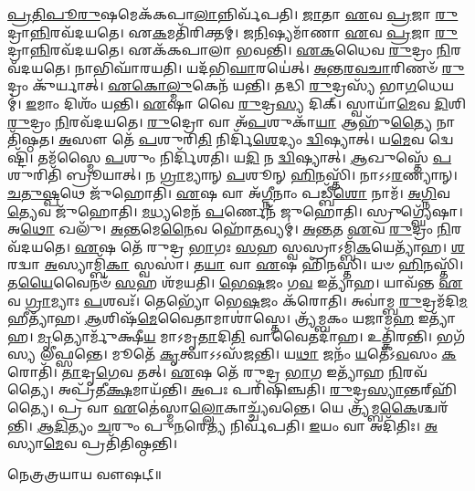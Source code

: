 \-\ul{𑌪𑍍𑌰}\-\-\ul{𑌤𑌿}\-\-\ul{𑌪𑍂}\-\-\ul{𑌰𑍁}\-𑌷𑌮𑍇𑌕᳴𑌕𑌪𑌾\-\ul{𑌲𑌾}\-𑌨𑍍𑌨𑌿𑌰𑍍𑌵᳴𑌪𑌤𑌿। \ul{𑌜𑌾}\-𑌤𑌾 \ul{𑌏}\-𑌵 \ul{𑌪𑍍𑌰}\-𑌜𑌾 \ul{𑌰𑍁}\-𑌦𑍍𑌰𑌾\-\ul{𑌨𑍍𑌨𑌿}\-𑌰𑌵᳴𑌦𑌯𑌤𑍇। 𑌏\-\ul{𑌕}\-𑌮𑌤𑌿᳴𑌰𑌿𑌕𑍍𑌤𑌮𑍍। \ul{𑌜}\-\-\ul{𑌨𑌿}\-𑌷𑍍𑌯𑌮𑌾᳴𑌣𑌾 \ul{𑌏}\-𑌵 \ul{𑌪𑍍𑌰}\-𑌜𑌾 \ul{𑌰𑍁}\-𑌦𑍍𑌰𑌾\-\ul{𑌨𑍍𑌨𑌿}\-𑌰𑌵᳴𑌦𑌯𑌤𑍇। 𑌏𑌕᳴𑌕𑌪𑌾𑌲𑌾 𑌭𑌵𑌨𑍍𑌤𑌿। \ul{𑌏}\-\-\ul{𑌕}\-𑌧𑍈𑌵 \ul{𑌰𑍁}\-𑌦𑍍𑌰𑌂 \ul{𑌨𑌿}\-𑌰𑌵᳴𑌦𑌯𑌤𑍇। 𑌨𑌾𑌭𑌿𑌘𑌾᳴𑌰𑌯𑌤𑌿। 𑌯𑌦᳴𑌭𑌿\-\ul{𑌘𑌾}\-𑌰𑌯𑍇॑𑌤𑍍। \ul{𑌅}\-\-\ul{𑌨𑍍𑌤}\-\-\ul{𑌰}\-\-\ul{𑌵}\-\-\ul{𑌚𑌾}\-𑌰𑌿𑌣𑍞᳴ \ul{𑌰𑍁}\-𑌦𑍍𑌰𑌂 𑌕𑍁᳴𑌰𑍍𑌯𑌾𑌤𑍍। \ul{𑌏}\-\-\ul{𑌕𑍋}\-\-\ul{𑌲𑍍𑌮𑍁}\-𑌕𑍇𑌨᳴ 𑌯𑌨𑍍𑌤𑌿। 
𑌤𑌦𑍍𑌧𑌿 \ul{𑌰𑍁}\-𑌦𑍍𑌰𑌸𑍍𑌯᳴ 𑌭𑌾\-\ul{𑌗}\-𑌧𑍇𑌯𑌮𑍍॑। \ul{𑌇}\-𑌮𑌾𑌂 𑌦𑌿𑌶𑌂᳴ 𑌯𑌨𑍍𑌤𑌿। \ul{𑌏}\-𑌷𑌾 𑌵𑍈 \ul{𑌰𑍁}\-𑌦𑍍𑌰\-\ul{𑌸𑍍𑌯} 𑌦𑌿𑌕𑍍। 𑌸𑍍𑌵𑌾𑌯𑌾᳴\-\ul{𑌮𑍇}\-𑌵 \ul{𑌦𑌿}\-𑌶𑌿 \ul{𑌰𑍁}\-𑌦𑍍𑌰𑌂 \ul{𑌨𑌿}\-𑌰𑌵᳴𑌦𑌯𑌤𑍇। \ul{𑌰𑍁}\-𑌦𑍍𑌰𑍋 𑌵𑌾 𑌅᳴\-\ul{𑌪}\-𑌶𑍁𑌕𑌾᳴\-\ul{𑌯𑌾} 𑌆𑌹𑍁᳴\-\ul{𑌤𑍍𑌯𑍈} 𑌨𑌾𑌤𑌿᳴𑌷𑍍𑌠𑌤। \ul{𑌅}\-𑌸𑍗 𑌤𑍇᳴ \ul{𑌪}\-𑌶𑍁𑌰𑌿\-\ul{𑌤𑌿} 𑌨𑌿𑌰𑍍𑌦𑌿᳴\-\ul{𑌶𑍇}\-𑌦𑍍𑌯𑌂 \ul{𑌦𑍍𑌵𑌿}\-𑌷𑍍𑌯𑌾𑌤𑍍। 𑌯\-\ul{𑌮𑍇}\-𑌵 𑌦𑍍𑌵𑍇𑌷𑍍𑌟𑌿᳴। 𑌤𑌮᳴𑌸𑍍𑌮𑍈 \ul{𑌪}\-𑌶𑍁𑌂 𑌨𑌿𑌰𑍍𑌦𑌿᳴𑌶𑌤𑌿। 𑌯\-\ul{𑌦𑌿} 𑌨 \ul{𑌦𑍍𑌵𑌿}\-𑌷𑍍𑌯𑌾𑌤𑍍। \ul{𑌆}\-𑌖𑍁𑌸𑍍𑌤𑍇᳴ \ul{𑌪}\-𑌶𑍁𑌰𑌿𑌤𑌿᳴ 𑌬𑍍𑌰𑍂𑌯𑌾𑌤𑍍। 
𑌨 \ul{𑌗𑍍𑌰𑌾}\-𑌮𑍍𑌯𑌾𑌨𑍍 \ul{𑌪}\-𑌶𑍂𑌨𑍍 \ul{𑌹𑌿}\-𑌨𑌸𑍍𑌤𑌿᳴। 𑌨𑌾𑌽𑌽\-\ul{𑌰}\-𑌣𑍍𑌯𑌾𑌨𑍍। \ul{𑌚}\-\-\ul{𑌤𑍁}\-\-\ul{𑌷𑍍𑌪}\-𑌥𑍇 𑌜𑍁᳴𑌹𑍋𑌤𑌿। \ul{𑌏}\-𑌷 𑌵𑌾 𑌅᳴\-\ul{𑌗𑍍𑌨𑍀}\-𑌨𑌾𑌂 𑌪𑌡𑍍𑌬𑍀᳴\-\ul{𑌶𑍋} 𑌨𑌾𑌮᳴। \ul{𑌅}\-\-\ul{𑌗𑍍𑌨𑌿}\-𑌵\-\ul{𑌤𑍍𑌯𑍇}\-𑌵 𑌜𑍁᳴𑌹𑍋𑌤𑌿। \ul{𑌮}\-\-\ul{𑌧𑍍𑌯}\-𑌮𑍇𑌨᳴ \ul{𑌪}\-𑌰𑍍𑌣𑍇𑌨᳴ 𑌜𑍁𑌹𑍋𑌤𑌿। 𑌸𑍍𑌰𑍁𑌗𑍍𑌘𑍍𑌯𑍇᳴𑌷𑌾। 𑌅\-\ul{𑌥𑍋} 𑌖𑌲𑍁᳴। \ul{𑌅}\-\-\ul{𑌨𑍍𑌤}\-𑌮𑍇\-\ul{𑌨𑍈}\-𑌵 𑌹𑍋᳴\-\ul{𑌤}\-𑌵𑍍𑌯𑌮𑍍॑। \ul{𑌅}\-\-\ul{𑌨𑍍𑌤}\-𑌤 \ul{𑌏}\-𑌵 \ul{𑌰𑍁}\-𑌦𑍍𑌰𑌂 \ul{𑌨𑌿}\-𑌰𑌵᳴𑌦𑌯𑌤𑍇। 
\-\ul{𑌏}\-𑌷 𑌤𑍇᳴ 𑌰𑍁𑌦𑍍𑌰 \ul{𑌭𑌾}\-𑌗𑌃 \ul{𑌸}\-𑌹 𑌸𑍍𑌵𑌸𑍍𑌰𑌾𑌽𑌮𑍍𑌬𑌿᳴\-\ul{𑌕}\-𑌯𑍇𑌤𑍍𑌯𑌾᳴𑌹। \ul{𑌶}\-𑌰𑌦𑍍𑌵𑌾 \ul{𑌅}\-𑌸𑍍𑌯𑌾𑌮𑍍𑌬𑌿᳴\-\ul{𑌕𑌾} 𑌸𑍍𑌵𑌸𑌾॑। 𑌤\-\ul{𑌯𑌾} 𑌵𑌾 \ul{𑌏}\-𑌷 𑌹𑌿᳴𑌨𑌸𑍍𑌤𑌿। 𑌯𑍞 \ul{𑌹𑌿}\-𑌨𑌸𑍍𑌤𑌿᳴। 𑌤\-\ul{𑌯𑍈}\-𑌵𑍈𑌨𑍞᳴ \ul{𑌸}\-𑌹 𑌶᳴𑌮𑌯𑌤𑌿। \ul{𑌭𑍇}\-\-\ul{𑌷}\-𑌜𑌂 𑌗\-\ul{𑌵} 𑌇𑌤𑍍𑌯𑌾᳴𑌹। 𑌯𑌾𑌵᳴𑌨𑍍𑌤 \ul{𑌏}\-𑌵 \ul{𑌗𑍍𑌰𑌾}\-𑌮𑍍𑌯𑌾𑌃 \ul{𑌪}\-𑌶𑌵𑌃᳴। 𑌤𑍇𑌭𑍍𑌯𑍋᳴ 𑌭𑍇\-\ul{𑌷}\-𑌜𑌂 𑌕᳴𑌰𑍋𑌤𑌿। 𑌅𑌵𑌾॑𑌮𑍍𑌬 \ul{𑌰𑍁}\-𑌦𑍍𑌰𑌮᳴𑌦𑌿\-\ul{𑌮}\-𑌹𑍀𑌤𑍍𑌯𑌾᳴𑌹। \ul{𑌆}\-𑌶𑌿𑌷᳴\-\ul{𑌮𑍇}\-𑌵𑍈𑌤𑌾𑌮𑌾𑌶𑌾॑𑌸𑍍𑌤𑍇। 
𑌤𑍍𑌰𑍍𑌯᳴𑌮𑍍𑌬𑌕𑌂 𑌯𑌜𑌾𑌮\-\ul{𑌹} 𑌇𑌤𑍍𑌯𑌾᳴𑌹। \ul{𑌮𑍃}\-𑌤𑍍𑌯𑍋𑌰𑍍𑌮𑍁᳴𑌕𑍍𑌷𑍀\-\ul{𑌯} 𑌮𑌾𑌽𑌮𑍃\-\ul{𑌤𑌾}\-𑌦𑌿\-\ul{𑌤𑌿} 𑌵𑌾𑌵𑍈𑌤𑌦𑌾᳴𑌹। 𑌉𑌤𑍍𑌕𑌿᳴𑌰𑌨𑍍𑌤𑌿। 𑌭𑌗᳴𑌸𑍍𑌯 𑌲𑍀𑌫𑍍𑌸𑌨𑍍𑌤𑍇। 𑌮𑍂𑌤𑍇᳴ \ul{𑌕𑍃}\-𑌤𑍍𑌵𑌾𑌽𑌽𑌸᳴𑌜𑌨𑍍𑌤𑌿। 𑌯\-\ul{𑌥𑌾} 𑌜𑌨𑌂᳴ \ul{𑌯}\-𑌤𑍇᳴𑌽\-\ul{𑌵}\-𑌸𑌂 \ul{𑌕}\-𑌰𑍋𑌤𑌿᳴। \ul{𑌤𑌾}\-𑌦𑍃\-\ul{𑌗𑍇}\-𑌵 𑌤𑌤𑍍। \ul{𑌏}\-𑌷 𑌤𑍇᳴ 𑌰𑍁𑌦𑍍𑌰 \ul{𑌭𑌾}\-𑌗 𑌇𑌤𑍍𑌯𑌾᳴𑌹 \ul{𑌨𑌿}\-𑌰𑌵᳴𑌤𑍍𑌯𑍈। 𑌅𑌪𑍍𑌰᳴𑌤𑍀\-\ul{𑌕𑍍𑌷}\-𑌮𑌾𑌯᳴𑌨𑍍𑌤𑌿। \ul{𑌅}\-𑌪𑌃 𑌪𑌰𑌿᳴𑌷𑌿𑌞𑍍𑌚𑌤𑌿। \mbox{\-\ul{𑌰𑍁}\-𑌦𑍍𑌰\-\ul{𑌸𑍍𑌯𑌾}\-𑌨𑍍𑌤𑌰𑍍‌\mbox{}𑌹𑌿᳴𑌤𑍍𑌯𑍈}। 𑌪𑍍𑌰 𑌵𑌾 \ul{𑌏}\-𑌤𑍇॑𑌸𑍍𑌮𑌾\-\ul{𑌲𑍍𑌲𑍋}\-𑌕𑌾𑌚𑍍𑌚𑍍𑌯᳴𑌵𑌨𑍍𑌤𑍇। 𑌯𑍇 𑌤𑍍𑌰𑍍𑌯᳴𑌮𑍍𑌬\-\ul{𑌕𑍈}\-𑌶𑍍𑌚𑌰᳴𑌨𑍍𑌤𑌿। \ul{𑌆}\-\-\ul{𑌦𑌿}\-𑌤𑍍𑌯𑌂 \ul{𑌚}\-𑌰𑍁𑌂 𑌪𑍁\-\ul{𑌨}\-𑌰𑍇\-\ul{𑌤𑍍𑌯} 𑌨𑌿𑌰𑍍𑌵᳴𑌪𑌤𑌿। \ul{𑌇}\-𑌯𑌂 𑌵𑌾 𑌅𑌦𑌿᳴𑌤𑌿𑌃। \ul{𑌅}\-𑌸𑍍𑌯𑌾\-\ul{𑌮𑍇}\-𑌵 𑌪𑍍𑌰𑌤𑌿᳴𑌤𑌿𑌷𑍍𑌠𑌨𑍍𑌤𑌿। 

𑌨𑍇𑌤𑍍𑌰𑌤𑍍𑌰𑌯𑌾𑌯 𑌵𑍗𑌷𑌟𑍍॥

{\small \closesection}



